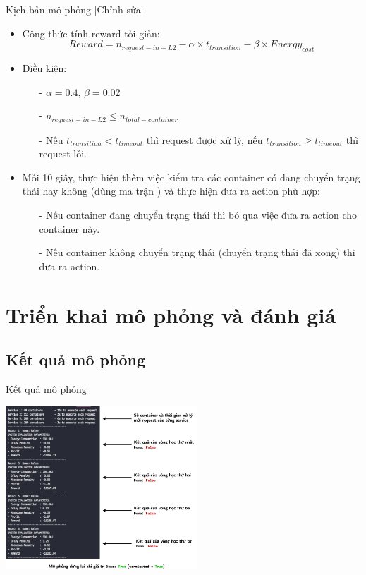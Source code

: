 \documentclass[10pt,aspectratio=169]{beamer}
\begin{document}
\begin{frame}{Kịch bản mô phỏng [Chỉnh sửa]}
\begin{itemize}
\setlength\itemsep{8pt}
\item Công thức tính reward tối giản: 
\begin{equation*}
Reward = n_{request-in-L2} - \alpha \times t_{transition} - \beta \times Energy_{cost}
\end{equation*}
\item Điều kiện: 
\begin{itemize}
\setlength\itemsep{4pt}
\item[-] $ \alpha = 0.4, \, \beta = 0.02 $
\item[-] $ n_{request-in-L2} \leq n_{total-container} $
\item[-] Nếu $ t_{transition} < t_{timeout} $ thì request được xử lý, nếu $ t_{transition} \geq t_{timeout} $ thì request lỗi.
\end{itemize}
\item Mỗi 10 giây, thực hiện thêm việc kiểm tra các container có đang chuyển trạng thái hay không (dùng ma trận ) và thực hiện đưa ra action phù hợp:
\begin{itemize}
\setlength\itemsep{4pt}
\item[-] Nếu container đang chuyển trạng thái thì bỏ qua việc đưa ra action cho container này.
\item[-] Nếu container không chuyển trạng thái (chuyển trạng thái đã xong) thì đưa ra action.
\end{itemize}
\end{itemize}
\end{frame}

\section{Triển khai mô phỏng và đánh giá}

\subsection{Kết quả mô phỏng}

\begin{frame}{Kết quả mô phỏng}
\begin{center}
\includegraphics[width=0.54\textwidth]{source/5.png}\\
\end{center}
\end{frame}
\end{document}
